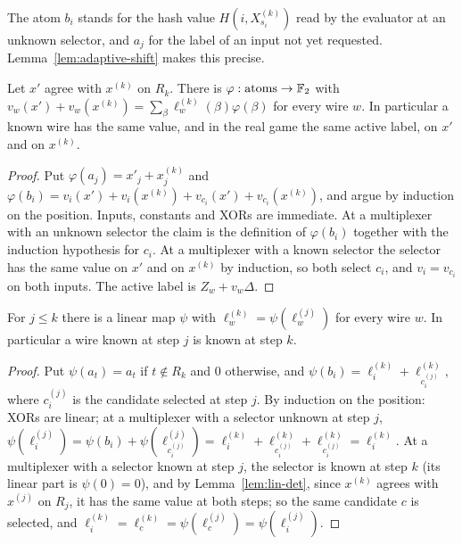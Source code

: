 The atom $b_i$ stands for the hash value $H(i, X^{(k)}_{s_i})$ read by the evaluator at an unknown
selector, and $a_j$ for the label of an input not yet requested. Lemma~\ref{lem:adaptive-shift}
makes this precise.

\begin{lemma}
  \label{lem:lin-det}
  \leanok
  Let $x'$ agree with $x^{(k)}$ on $R_k$. There is $\varphi : \mathrm{atoms} \to \mathbb{F}_2$ with
  $v_w(x') + v_w(x^{(k)}) = \sum_\beta \ell^{(k)}_w(\beta) \varphi(\beta)$ for every wire $w$. In
  particular a known wire has the same value, and in the real game the same active label, on $x'$
  and on $x^{(k)}$.
\end{lemma}

\begin{proof}
  \leanok
  Put $\varphi(a_j) = x'_j + x^{(k)}_j$ and $\varphi(b_i) = v_i(x') + v_i(x^{(k)}) + v_{c_i}(x') +
  v_{c_i}(x^{(k)})$, and argue by induction on the position. Inputs, constants and XORs are
  immediate. At a multiplexer with an unknown selector the claim is the definition of
  $\varphi(b_i)$ together with the induction hypothesis for $c_i$. At a multiplexer with a known
  selector the selector has the same value on $x'$ and on $x^{(k)}$ by induction, so both select
  $c_i$, and $v_i = v_{c_i}$ on both inputs. The active label is $Z_w + v_w \Delta$.
\end{proof}

\begin{lemma}[Monotonicity]
  \label{lem:lin-mono}
  \leanok
  For $j \le k$ there is a linear map $\psi$ with $\ell^{(k)}_w = \psi(\ell^{(j)}_w)$ for every
  wire $w$. In particular a wire known at step $j$ is known at step $k$.
\end{lemma}

\begin{proof}
  \leanok
  Put $\psi(a_t) = a_t$ if $t \notin R_k$ and $0$ otherwise, and $\psi(b_i) = \ell^{(k)}_i +
  \ell^{(k)}_{c^{(j)}_i}$, where $c^{(j)}_i$ is the candidate selected at step $j$. By induction on
  the position: XORs are linear; at a multiplexer with a selector unknown at step $j$,
  $\psi(\ell^{(j)}_i) = \psi(b_i) + \psi(\ell^{(j)}_{c^{(j)}_i}) = \ell^{(k)}_i +
  \ell^{(k)}_{c^{(j)}_i} + \ell^{(k)}_{c^{(j)}_i} = \ell^{(k)}_i$. At a multiplexer with a selector known at step $j$, the selector is known at step
  $k$ (its linear part is $\psi(0) = 0$), and by Lemma~\ref{lem:lin-det}, since $x^{(k)}$ agrees with
  $x^{(j)}$ on $R_j$, it has the same value at both steps; so the same candidate $c$ is selected,
  and $\ell^{(k)}_i = \ell^{(k)}_c = \psi(\ell^{(j)}_c) = \psi(\ell^{(j)}_i)$.
\end{proof}


